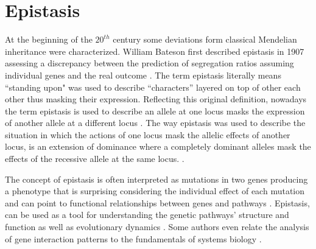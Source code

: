 \section{Epistasis \label{sec:epi}}


At the beginning of the $20^{th}$ century some deviations form classical Mendelian inheritance were characterized.
William Bateson first described epistasis in 1907 \cite{tyler2009shadows} assessing a discrepancy between the prediction of segregation ratios assuming individual genes and the real outcome \cite{phillips2008epistasis}.
The term epistasis literally means ``standing upon" was used to describe ``characters'' layered on top of other each other thus masking their expression. 
Reflecting this original definition, nowadays the term epistasis is used to describe an allele at one locus masks the expression of another allele at a different locus \cite{cordell2002epistasis}.
The way epistasis was used to describe the situation in which the actions of one locus mask the allelic effects of another locus, is an extension of dominance where a completely dominant alleles mask the effects of the recessive allele at the same locus. \cite{carlborg2004epistasis, cordell2002epistasis}.

The concept of epistasis is often interpreted as mutations in two genes producing a phenotype that is surprising considering the individual effect of each mutation and can point to functional relationships between genes and pathways \cite{mani2008defining}.
Epistasis, can be used as a tool for understanding the genetic pathways' structure and function as well as evolutionary dynamics \cite{phillips2008epistasis}. 
Some authors even relate the analysis of gene interaction patterns to the fundamentals of systems biology \cite{phillips2008epistasis}.

